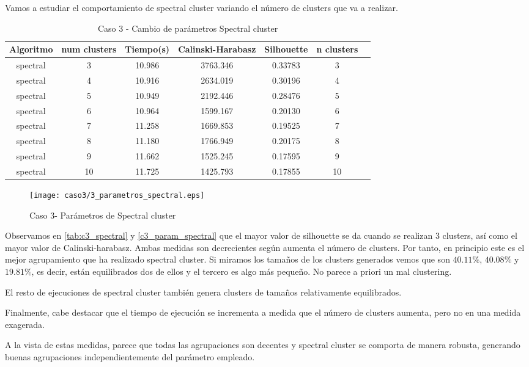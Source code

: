 Vamos a estudiar el comportamiento de spectral cluster variando el número de clusters que va a realizar.

\begin{table}[H]
\centering
\caption{Caso 3 - Cambio de parámetros Spectral cluster}
\label{tab:c3_spectral}
\begin{tabular}{ccccccc}
\toprule
Algoritmo & num clusters & Tiempo(s) & Calinski-Harabasz & Silhouette & n clusters \\
\midrule
spectral & 3 & 10.986 & 3763.346 & 0.33783 & 3 \\
spectral & 4 & 10.916 & 2634.019 & 0.30196 & 4 \\
spectral & 5 & 10.949 & 2192.446 & 0.28476 & 5 \\
spectral & 6 & 10.964 & 1599.167 & 0.20130 & 6 \\
spectral & 7 & 11.258 & 1669.853 & 0.19525 & 7 \\
spectral & 8 & 11.180 & 1766.949 & 0.20175 & 8 \\
spectral & 9 & 11.662 & 1525.245 & 0.17595 & 9 \\
spectral & 10 & 11.725 & 1425.793 & 0.17855 & 10 \\
\bottomrule
\end{tabular}
\end{table}

\begin{figure}[H]
\caption{Caso 3- Parámetros de Spectral cluster}
\label{c3_param_spectral}
\texttt{[image: caso3/3\_parametros\_spectral.eps]}
\end{figure}


Observamos en \eqref{tab:c3_spectral} y \eqref{c3_param_spectral} que el mayor valor de silhouette se da cuando se realizan 3 clusters, así como el mayor valor de Calinski-harabasz. Ambas medidas son decrecientes según aumenta el número de clusters. Por tanto, en principio este es el mejor agrupamiento que ha realizado spectral cluster. Si miramos los tamaños de los clusters generados vemos que son $40.11\%$, $40.08\%$ y $19.81\%$, es decir, están equilibrados dos de ellos y el tercero es algo más pequeño. No parece a priori un mal clustering.

El resto de ejecuciones de spectral cluster también genera clusters de tamaños relativamente equilibrados.

Finalmente, cabe destacar que el tiempo de ejecución se incrementa a medida que el número de clusters aumenta, pero no en una medida exagerada.

A la vista de estas medidas, parece que todas las agrupaciones son decentes y spectral cluster se comporta de manera robusta, generando buenas agrupaciones independientemente del parámetro empleado.


